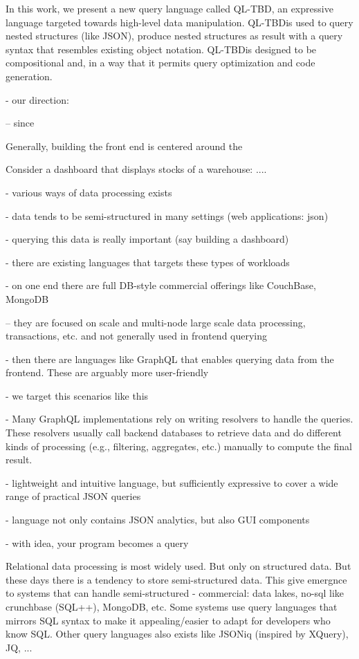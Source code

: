 \documentclass[runningheads]{llncs}
\newcommand{\lang}{QL-TBD}
\begin{document}
In this work, we present a new query language called \lang, an expressive language
targeted towards high-level data manipulation.
\lang is used to query nested structures (like JSON), produce nested structures as 
result with a query syntax that resembles existing object notation.
\lang is designed to be compositional and, in a way that it permits query
optimization and code generation.



- our direction: 

-- since 


Generally, building the front end is centered around the 


Consider a dashboard that displays stocks of a warehouse: ....


- various ways of data processing exists

- data tends to be semi-structured in many settings (web applications: json)

- querying this data is really important (say building a dashboard)

- there are existing languages that targets these types of workloads

- on one end there are full DB-style commercial offerings like CouchBase, MongoDB

-- they are focused on scale and multi-node large scale data processing, transactions, etc. 
    and not generally used in frontend querying

- then there are languages like GraphQL that enables querying data from the frontend. 
   These are arguably more user-friendly  

- we target this scenarios like this

- Many GraphQL implementations rely on writing resolvers to handle the queries. These
  resolvers usually call backend databases to retrieve data and do different kinds of processing
  (e.g., filtering, aggregates, etc.) manually to compute the final result.


- lightweight and intuitive language, but sufficiently expressive to cover a wide range 
   of practical JSON queries

- language not only contains JSON analytics, but also GUI components

- with idea, your program becomes a query


Relational data processing is most widely used. But only on structured data.
But these days there is a tendency to store semi-structured data.
This give emergnce to systems that can handle semi-structured
 - commercial: data lakes, no-sql like crunchbase (SQL++), MongoDB, etc.
Some systems use query languages that mirrors SQL syntax to make it appealing/easier
to adapt for developers who know SQL.
Other query languages also exists like JSONiq (inspired by XQuery), JQ, ...
\end{document}
